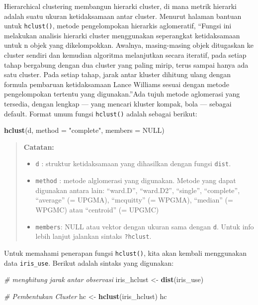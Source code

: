 \documentclass[
]{book}
\newenvironment{Shaded}{\begin{snugshade}}{\end{snugshade}}
\newcommand{\AttributeTok}[1]{\textcolor[rgb]{0.13,0.29,0.53}{#1}}
\newcommand{\CommentTok}[1]{\textcolor[rgb]{0.56,0.35,0.01}{\textit{#1}}}
\newcommand{\ConstantTok}[1]{\textcolor[rgb]{0.56,0.35,0.01}{#1}}
\newcommand{\FunctionTok}[1]{\textcolor[rgb]{0.13,0.29,0.53}{\textbf{#1}}}
\newcommand{\NormalTok}[1]{#1}
\newcommand{\OtherTok}[1]{\textcolor[rgb]{0.56,0.35,0.01}{#1}}
\newcommand{\StringTok}[1]{\textcolor[rgb]{0.31,0.60,0.02}{#1}}
\providecommand{\tightlist}{%
  \setlength{\itemsep}{0pt}\setlength{\parskip}{0pt}}
\theoremstyle{definition}
\theoremstyle{definition}
\theoremstyle{definition}
\theoremstyle{definition}
\theoremstyle{remark}
\begin{document}
Hierarchical clustering membangun hierarki cluster, di mana metrik hierarki adalah suatu ukuran ketidaksamaan antar cluster. Menurut halaman bantuan untuk \texttt{hclust()}, metode pengelompokan hierarkis aglomeratif, ``Fungsi ini melakukan analisis hierarki cluster menggunakan seperangkat ketidaksamaan untuk n objek yang dikelompokkan. Awalnya, masing-masing objek ditugaskan ke cluster sendiri dan kemudian algoritma melanjutkan secara iteratif, pada setiap tahap bergabung dengan dua cluster yang paling mirip, terus sampai hanya ada satu cluster. Pada setiap tahap, jarak antar kluster dihitung ulang dengan formula pembaruan ketidaksamaan Lance Williams sesuai dengan metode pengelompokan tertentu yang digunakan.''Ada tujuh metode aglomerasi yang tersedia, dengan lengkap --- yang mencari kluster kompak, bola --- sebagai default. Format umum fungsi \texttt{hclust()} adalah sebagai berikut:

\begin{Shaded}
\begin{Highlighting}[]
\FunctionTok{hclust}\NormalTok{(d, }\AttributeTok{method =} \StringTok{"complete"}\NormalTok{, }\AttributeTok{members =} \ConstantTok{NULL}\NormalTok{)}
\end{Highlighting}
\end{Shaded}

\begin{quote}
\textbf{Catatan:}

\begin{itemize}
\tightlist
\item
  \texttt{d} : struktur ketidaksamaan yang dihasilkan dengan fungsi \texttt{dist}.
\item
  \texttt{method} : metode alglomerasi yang digunakan. Metode yang dapat digunakan antara lain: ``ward.D'', ``ward.D2'', ``single'', ``complete'', ``average'' (= UPGMA), ``mcquitty'' (= WPGMA), ``median'' (= WPGMC) atau ``centroid'' (= UPGMC)
\item
  \texttt{members}: NULL atau vektor dengan ukuran sama dengan \texttt{d}. Untuk info lebih lanjut jalankan sintaks \texttt{?hclust}.
\end{itemize}
\end{quote}

Untuk memahami penerapan fungsi \texttt{hclust()}, kita akan kembali menggunakan data \texttt{iris\_use}. Berikut adalah sintaks yang digunakan:

\begin{Shaded}
\begin{Highlighting}[]
\CommentTok{\# menghitung jarak antar observasi}
\NormalTok{iris\_hclust }\OtherTok{\textless{}{-}} \FunctionTok{dist}\NormalTok{(iris\_use)}

\CommentTok{\# Pembentukan Cluster}
\NormalTok{hc }\OtherTok{\textless{}{-}} \FunctionTok{hclust}\NormalTok{(iris\_hclust)}
\NormalTok{hc}
\end{Highlighting}
\end{Shaded}
\end{document}
